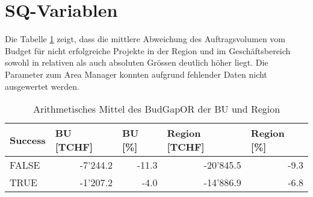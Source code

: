 \section{SQ-Variablen}
Die Tabelle \ref{tab:msq} zeigt, dass die mittlere Abweichung des Auftragsvolumen vom Budget für nicht erfolgreiche Projekte in der Region und im Geschäftsbereich sowohl in relativen als auch absoluten Grössen deutlich höher liegt. Die Parameter zum Area Manager konnten aufgrund fehlender Daten nicht ausgewertet werden.
\begin{table}[H]
	\centering
	\caption{Arithmetisches Mittel des BudGapOR der BU und Region}
	\begin{tabular}{lrr|rr}
		\toprule
		\textbf{Success} & \multicolumn{1}{l}{\textbf{BU [TCHF]}} & \multicolumn{1}{l}{\textbf{BU [\%]}} & \multicolumn{1}{l}{\textbf{Region [TCHF]}} & \multicolumn{1}{l}{\textbf{Region [\%]}} \\\hline
		FALSE & -7'244.2 & -11.3 & -20'845.5 & -9.3 \\
		TRUE  & -1'207.2 & -4.0  & -14'886.9 & -6.8 \\
		\bottomrule
	\end{tabular}%
	\label{tab:msq}%
\end{table}%
\newpage
